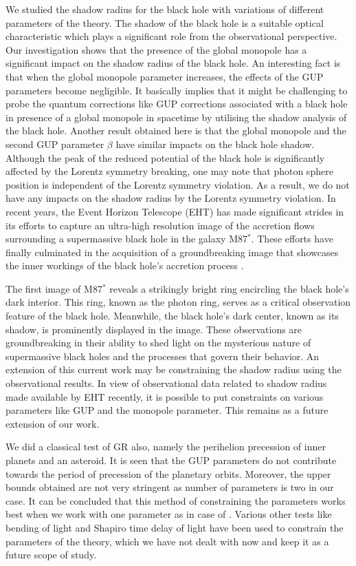 \documentclass[aps,amsmath,amssymb,showpacs,showkeys]{revtex4}
\begin{document}
We studied the shadow radius for the black hole with variations of different 
parameters of the theory. The shadow of the black hole is a suitable optical 
characteristic which plays a significant role from the observational 
perspective. Our investigation shows that the presence of the global monopole 
has a significant impact on the shadow radius of the black hole. An 
interesting fact is that when the global monopole parameter increases, the 
effects of the GUP parameters become negligible. It basically implies that it 
might be challenging to probe the quantum corrections like GUP corrections 
associated with a black hole in presence of a global monopole in spacetime 
by utilising the shadow analysis of the black hole. Another result obtained 
here is that the global monopole and the second GUP parameter $\beta$ have 
similar impacts on the black hole shadow. Although the peak of the reduced 
potential of the black hole is significantly affected by the Lorentz symmetry 
breaking, one may note that photon sphere position is independent of the 
Lorentz symmetry violation. As a result, we do not have any impacts on the 
shadow radius by the Lorentz symmetry violation. In recent years, the Event 
Horizon Telescope (EHT) has made significant strides in its efforts to capture 
an ultra-high resolution image of the accretion flows surrounding a 
supermassive black hole in the galaxy M87$^*$. These efforts have finally 
culminated in the acquisition of a groundbreaking image that showcases 
the inner workings of the black hole's accretion process \cite{6,7,8,9,10,11}.

The first image of M87$^*$ reveals a strikingly bright ring encircling the 
black hole's dark interior. This ring, known as the photon ring, serves as a 
critical observation feature of the black hole. Meanwhile, the black hole's 
dark center, 
known as its shadow, is prominently displayed in the image. These observations 
are groundbreaking in their ability to shed light on the mysterious nature of 
supermassive black holes and the processes that govern their behavior. An 
extension of this current work may be constraining the shadow radius using 
the observational results.  In view of observational data related to 
shadow radius made available by EHT recently, it is possible to put 
constraints on various parameters like GUP and the monopole parameter. This 
remains as a future extension of our work.

We did a classical test of GR also, namely the perihelion precession of inner 
planets and an asteroid. It is seen that the GUP parameters do not 
contribute towards the period of precession of the planetary orbits. 
Moreover, the upper 
bounds obtained are not very stringent as number of parameters is two in our 
case. It can be concluded that this method of constraining the parameters 
works best when we work with one parameter as in case of \cite{17}. 
Various other tests like bending of light and Shapiro time 
delay of light have been used to constrain the parameters of the theory, which 
we have not dealt with now and keep it as a future scope of study.
\end{document}

